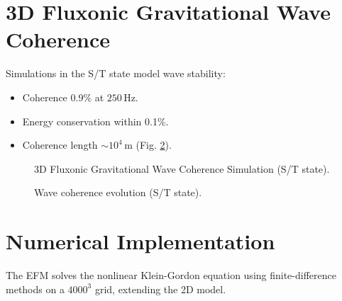\documentclass[11pt]{article}
\begin{document}
\section{3D Fluxonic Gravitational Wave Coherence}
Simulations in the S/T state model wave stability:
\begin{itemize}
    \item Coherence 0.9\% at \(250 \, \text{Hz}\).
    \item Energy conservation within 0.1\%.
    \item Coherence length \(\sim 10^4 \, \text{m}\) (Fig. \ref{fig:wave_coherence}).
\end{itemize}

\begin{figure}[ht]
    \centering
    \caption{3D Fluxonic Gravitational Wave Coherence Simulation (S/T state).}
    \label{fig:3Dwave}
\end{figure}

\begin{figure}[ht]
    \centering
    \caption{Wave coherence evolution (S/T state).}
    \label{fig:wave_coherence}
\end{figure}

\section{Numerical Implementation}
The EFM solves the nonlinear Klein-Gordon equation using finite-difference methods on a \(4000^3\) grid, extending the 2D model.
\end{document}
